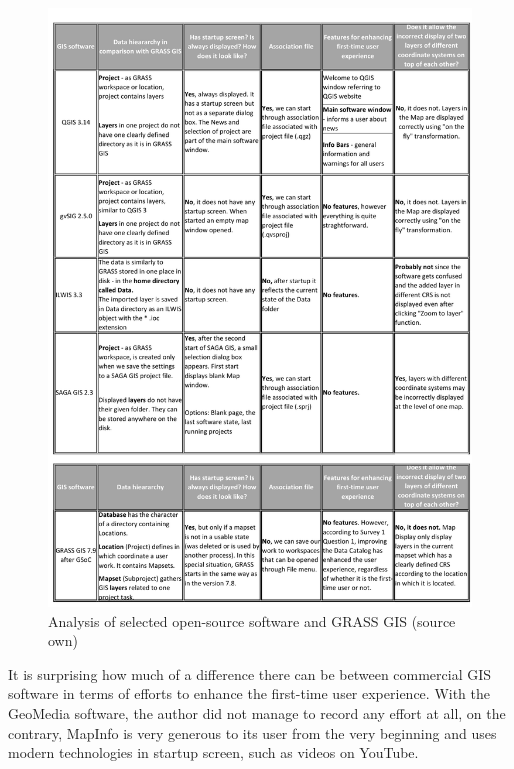 \documentclass[a4paper,10pt,twoside]{article}
\begin{document}
\vspace{0.3cm}
\begin{figure}[hbt!] 
\begin{center}
\includegraphics[width=15cm]{../pictures/open-source_software.pdf} 
\caption[Analysis of selected open-source software and GRASS GIS (source own)]{Analysis of selected open-source software and GRASS GIS (source own)}
\label{fig:open-source_software}
\end{center}
\end{figure}

\newpage
It is surprising how much of a difference there can be between commercial GIS software in terms of efforts to enhance the first-time user experience. With the GeoMedia software, the author did not manage to record any effort at all, on the contrary, MapInfo is very generous to its user from the very beginning and uses modern technologies in startup screen, such as videos on YouTube. 
\end{document}
